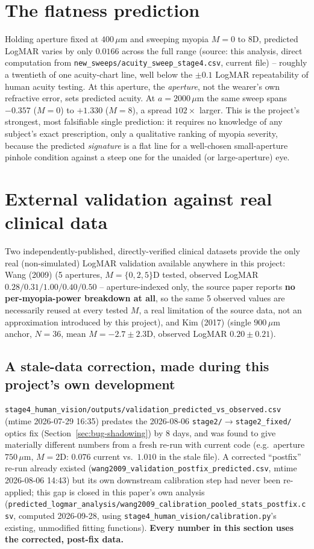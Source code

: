\section{The flatness prediction}
\label{sec:flatness-prediction}
Holding aperture fixed at $400\,\mu$m and sweeping myopia $M=0$ to $8$D, predicted
LogMAR varies by only $0.0166$ across the full range (source: this analysis, direct
computation from \texttt{new\_sweeps/acuity\_sweep\_stage4.csv}, current file) --
roughly a twentieth of one acuity-chart line, well below the $\pm0.1$ LogMAR
repeatability of human acuity testing. At this aperture, the \emph{aperture}, not the
wearer's own refractive error, sets predicted acuity. At $a=2000\,\mu$m the same sweep
spans $-0.357$ ($M=0$) to $+1.330$ ($M=8$), a spread $102\times$ larger. This is the
project's strongest, most falsifiable single prediction: it requires no knowledge of
any subject's exact prescription, only a qualitative ranking of myopia severity,
because the predicted \emph{signature} is a flat line for a well-chosen small-aperture
pinhole condition against a steep one for the unaided (or large-aperture) eye.

\section{External validation against real clinical data}
\label{sec:external-validation}
Two independently-published, directly-verified clinical datasets provide the only real
(non-simulated) LogMAR validation available anywhere in this project: Wang (2009)
\citep{wang2009} (5 apertures, $M=\{0,2,5\}$D tested, observed LogMAR
$0.28/0.31/1.00/0.40/0.50$ -- aperture-indexed only, the source paper reports
\textbf{no per-myopia-power breakdown at all}, so the same 5 observed values are
necessarily reused at every tested $M$, a real limitation of the source data, not an
approximation introduced by this project), and Kim (2017) \citep{kim2017} (single
$900\,\mu$m anchor, $N=36$, mean $M=-2.7\pm2.3$D, observed LogMAR $0.20\pm0.21$).

\subsection{A stale-data correction, made during this project's own development}
\label{sec:stale-wang}
\texttt{stage4\_human\_vision/outputs/validation\_predicted\_vs\_observed.csv} (mtime
2026-07-29 16:35) predates the 2026-08-06 \texttt{stage2/}$\to$\texttt{stage2\_fixed/}
optics fix (Section~\ref{sec:bug-shadowing}) by 8 days, and was found to give
materially different numbers from a fresh re-run with current code (e.g.\ aperture
$750\,\mu$m, $M=2$D: $0.076$ current vs.\ $1.010$ in the stale file). A corrected
``postfix'' re-run already existed
(\texttt{wang2009\_validation\_postfix\_predicted.csv}, mtime 2026-08-06 14:43) but its
own downstream calibration step had never been re-applied; this gap is closed in this
paper's own analysis (\texttt{predicted\_logmar\_analysis/wang2009\_calibration\_pooled\_stats\_postfix.csv},
computed 2026-09-28, using \texttt{stage4\_human\_vision/calibration.py}'s existing,
unmodified fitting functions). \textbf{Every number in this section uses the corrected,
post-fix data.}

